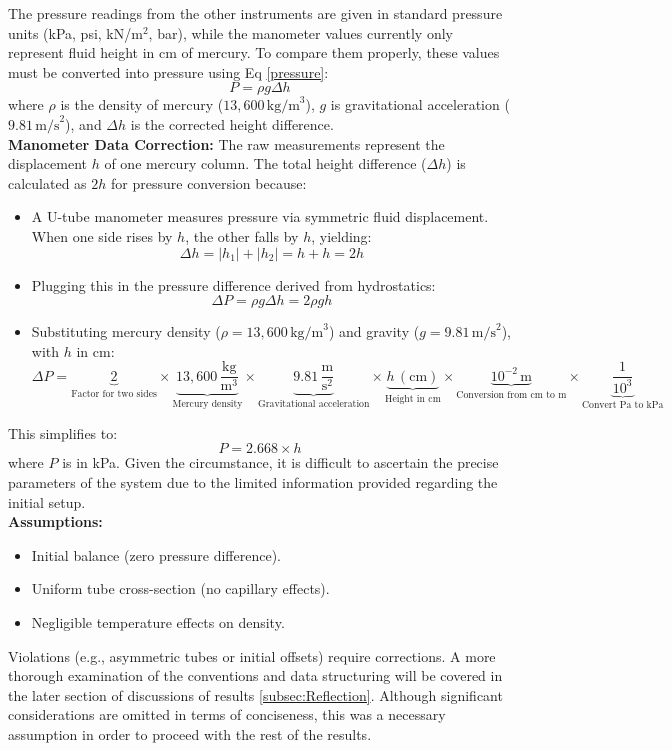 \documentclass{article}
\begin{document}
\noindent
The pressure readings from the other instruments are given in standard pressure units (kPa, psi, kN/m\(^2\), bar), while the manometer values currently only represent fluid height in cm of mercury. To compare them properly, these values must be converted into pressure using Eq \ref{pressure}:
\[P = \rho g \Delta h\]
where \( \rho \) is the density of mercury (\(13,600 \, \text{kg/m}^3\)), \( g \) is gravitational acceleration (\(9.81 \, \text{m/s}^2\)), and $\Delta h$ is the corrected height difference.\\[1em]
\textbf{Manometer Data Correction:} The raw measurements represent the displacement \( h \) of one mercury column. The total height difference (\(\Delta h\)) is calculated as \( 2h \) for pressure conversion because:
	\begin{itemize}
		\item A U-tube manometer measures pressure via symmetric fluid displacement. When one side rises by \( h \), the other falls by \( h \), yielding:
		\[\Delta h = |h_1| + |h_2| = h + h = 2h\]
		\item Plugging this in the pressure difference derived from hydrostatics:
		\[\Delta P = \rho g \Delta h = 2 \rho g h\]
		\item Substituting mercury density (\(\rho = 13,\!600\,\text{kg/m}^3\)) and gravity (\(g = 9.81\,\text{m/s}^2\)), with \( h \) in cm:
			\[
			\Delta P = \underbrace{2}_{\text{Factor for two sides}} \times \underbrace{13,600 \, \frac{\text{kg}}{\text{m}^3}}_{\text{Mercury density}} \times \underbrace{9.81 \, \frac{\text{m}}{\text{s}^2}}_{\text{Gravitational acceleration}} \times \underbrace{h \, (\text{cm})}_{\text{Height in cm}} \times \underbrace{10^{-2} \, \text{m}}_{\text{Conversion from cm to m}} \times \underbrace{\frac{1}{10^3}}_{\text{Convert Pa to kPa}}
			\]
	\end{itemize}
\newpage{}
\begin{minipage}{0.55\textwidth}
This simplifies to:
\[P = 2.668 \times h\]
where \( P \) is in kPa. Given the circumstance, it is difficult to ascertain the precise parameters of the system due to the limited information provided regarding the initial setup. \\[4pt]
\textbf{Assumptions:} 
\begin{itemize}
	\item Initial balance (zero pressure difference).
	\item Uniform tube cross-section (no capillary effects).
	\item Negligible temperature effects on density.
\end{itemize}\vspace{0.2em}
Violations (e.g., asymmetric tubes or initial offsets) require corrections. A more thorough examination of the conventions and data structuring will be covered in the later section of discussions of results \ref{subsec:Reflection}. Although significant considerations are omitted in terms of conciseness, this was a necessary assumption in order to proceed with the rest of the results.\\ 
\end{minipage}\hspace{1em}
\end{document}
